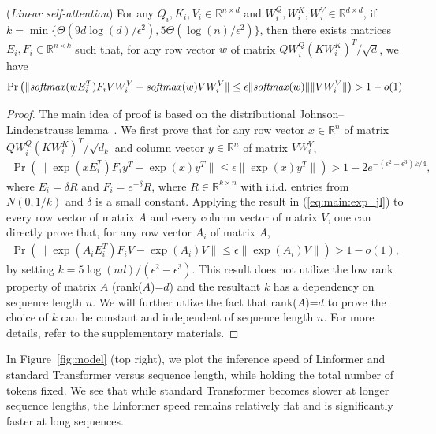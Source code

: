 \begin{theorem} 
\label{thm:factorization} (\emph{Linear self-attention}) For any $Q_i, K_i, V_i\in\mathbb{R}^{n\times d}$ and $W_i^Q, W_i^K, W_i^V\in\mathbb{R}^{d\times d}$, if $k=\min\{\Theta(9d\log(d)/\epsilon^2), 5\Theta(\log(n)/\epsilon^2)\}$, then there exists matrices $E_i, F_i\in\mathbb{R}^{n\times k}$ such that, for any row vector $w$ of matrix $QW_i^Q(KW_i^K)^T/\sqrt{d}$, we have
\begin{equation}
\Pr\left(\|\mbox{\emph{softmax}}(wE_i^T)F_iVW_i^V-\mbox{\emph{softmax}}(w)VW_i^V\|\leq \epsilon\|\mbox{\emph{softmax}}(w)\|\|VW_i^V\|\right)>1-o(1)
\end{equation}
\end{theorem}

\begin{proof}
The main idea of proof is based on the distributional Johnson–Lindenstrauss lemma~\citep{lindenstrauss1984extensions}. We first prove that for any row vector $x\in\mathbb{R}^{n}$ of matrix $QW_i^Q(KW_i^K)^T/\sqrt{d_k}$ and column vector $y\in\mathbb{R}^{n}$ of matrix $VW_i^V$, 
\begin{align}
\Pr\left(\|\exp(xE_i^T)F_iy^T-\exp(x)y^T\|\leq \epsilon\|\exp(x)y^T\|\right)>1-2e^{-(\epsilon^2-\epsilon^3)k/4},\label{eq:main:exp_jl}
\end{align}
where $E_i=\delta R$ and $F_i=e^{-\delta}R$, where $R\in\mathbb{R}^{k\times n}$ with i.i.d. entries from $N(0, 1/k)$ and $\delta$ is a small constant. Applying the result in (\ref{eq:main:exp_jl}) to every row vector of matrix $A$ and every column vector of matrix $V$, one can directly prove that, for any row vector $A_i$ of matrix $A$,
\begin{align}\label{eq:submatrix_jl}
\Pr\left(\|\exp(A_iE_i^T)F_iV-\exp(A_i)V\|\leq \epsilon\|\exp(A_i)V\|\right)>1-o(1),
\end{align}
by setting $k=5\log(nd)/(\epsilon^2-\epsilon^3)$. This result does not utilize the low rank property of matrix $A$ (rank($A$)=$d$) and the resultant $k$ has a dependency on sequence length $n$. We will further utlize the fact that rank($A$)=$d$ to prove the choice of $k$ can be constant and independent of sequence length $n$. For more details, refer to the supplementary materials.

\end{proof}

In Figure~\ref{fig:model} (top right), we plot the inference speed of Linformer and standard Transformer versus sequence length, while holding the total number of tokens fixed. We see that while standard Transformer becomes slower at longer sequence lengths, the Linformer speed remains relatively flat and is significantly faster at long sequences.

